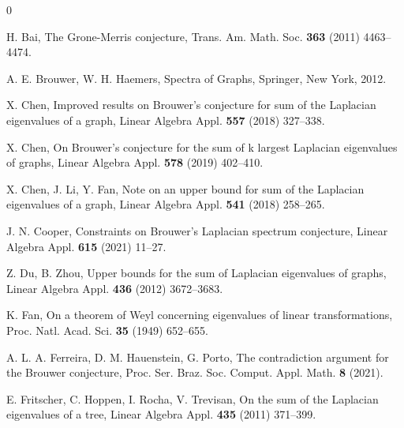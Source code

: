 \documentclass[12pt]{article}
\theoremstyle{plain}
\theoremstyle{definition}
\begin{document}
\begin{thebibliography}{0}

H. Bai, The Grone-Merris conjecture, Trans. Am. Math. Soc. {\bf 363} (2011) 4463–4474.


A. E. Brouwer, W. H. Haemers, Spectra of Graphs, Springer, New York, 2012.


X. Chen, Improved results on Brouwer’s conjecture for sum of the Laplacian eigenvalues of a graph, Linear Algebra Appl. {\bf 557} (2018) 327–338.

X. Chen, On Brouwer’s conjecture for the sum of k largest Laplacian eigenvalues of graphs, Linear Algebra Appl. {\bf 578} (2019) 402–410.

X. Chen, J. Li, Y. Fan,  Note on an upper bound for sum of the Laplacian eigenvalues of a graph, Linear Algebra Appl. {\bf 541} (2018) 258–265.


J. N. Cooper, Constraints on Brouwer’s Laplacian spectrum conjecture, Linear Algebra Appl. {\bf 615} (2021) 11–27.


Z. Du, B. Zhou, Upper bounds for the sum of Laplacian eigenvalues of graphs, Linear Algebra Appl. {\bf 436} (2012) 3672–3683.

K. Fan, On a theorem of Weyl concerning eigenvalues of linear transformations, Proc. Natl. Acad. Sci. {\bf 35} (1949) 652–655.

A. L. A. Ferreira, D. M. Hauenstein, G. Porto, The contradiction argument for the Brouwer conjecture, Proc. Ser. Braz. Soc. Comput. Appl. Math. {\bf 8} (2021).


E. Fritscher, C. Hoppen, I. Rocha, V. Trevisan, On the sum of the Laplacian eigenvalues of a tree, Linear Algebra Appl. {\bf 435} (2011) 371–399.


\end{thebibliography}
\end{document}
